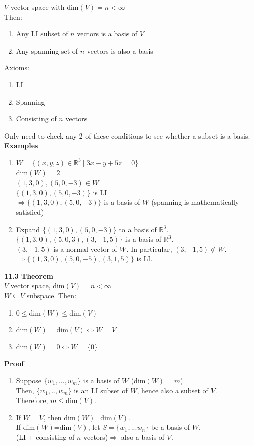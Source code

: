\documentclass[]{article}
\begin{document}
		\normalsize
		$V$ vector space with dim$(V)=n<\infty$\\
		Then:
		\begin{enumerate}
			\item Any LI subset of $n$ vectors is a basis of $V$
			\item Any spanning set of $n$ vectors is also a basis 
		\end{enumerate}
		Axioms:
		\begin{enumerate}
			\item LI
			\item Spanning
			\item Consisting of $n$ vectors
		\end{enumerate}
		Only need to check any 2 of these conditions to see whether a subset is a basis.\\
		{\bf Examples}
		\begin{enumerate}
			\item $W=\{(x,y,z)\in\mathbb{R}^3~|~3x-y+5z=0\}$\\
			dim$(W)=2$\\
			$(1,3,0),(5,0,-3)\in W$\\
			$\{(1,3,0),(5,0,-3)\}$ is LI\\
			$\Rightarrow\{(1,3,0),(5,0,-3)\}$ is a basis of $W$ (spanning is mathematically satisfied)
			\item Expand $\{(1,3,0),(5,0,-3)\}$ to a basis of $\mathbb{R}^3$.\\
			$\{(1,3,0),(5,0,3),(3,-1,5)\}$ is a basis of $\mathbb{R}^3$.\\
			$(3,-1,5)$ is a normal vector of $W$. In particular, $(3,-1,5)\notin W$.\\
			$\Rightarrow\{(1,3,0),(5,0,-5),(3,1,5)\}$ is LI.
		\end{enumerate}
		\large{\bf 11.3 Theorem}\\
		\normalsize
		$V$ vector space, dim$(V)=n<\infty$\\
		$W\subseteq V$ subspace. Then:
		\begin{enumerate}
			\item $0\le\text{dim}(W)\le\text{dim}(V)$
			\item dim$(W)=$dim$(V)\iff W=V$
			\item dim$(W)=0\iff W=\{0\}$
		\end{enumerate}
		{\bf Proof}\\
		\begin{enumerate}
			\item Suppose $\{w_1,...,w_m\}$ is a basis of $W$ (dim$(W)=m$).\\
			Then, $\{w_1,..,w_m\}$ is an LI subset of $W$, hence also a subset of $V$.\\
			Therefore, $m\le\text{dim}(V)$.
			\item If $W=V$, then dim$(W)$=dim$(V)$.\\
			If dim$(W)$=dim$(V)$, let $S=\{w_1,...w_n\}$ be a basis of $W$.\\
			(LI + consisting of $n$ vectors)$\Rightarrow$ also a basis of $V$.
		\end{enumerate}
\end{document}
